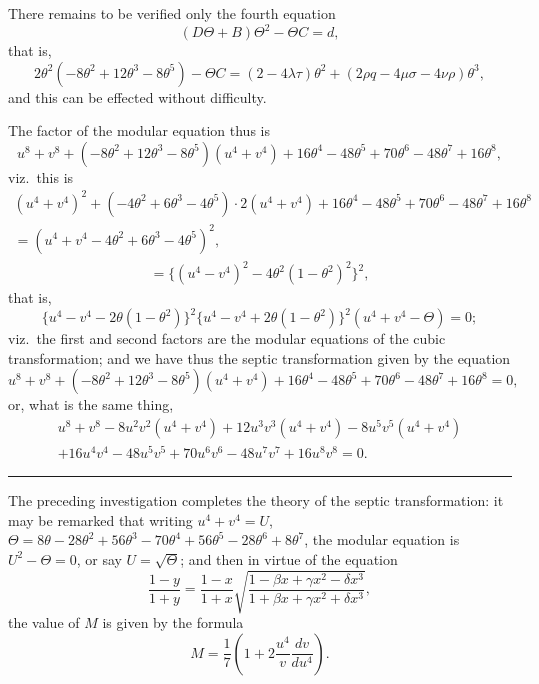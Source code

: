 \documentclass[11pt,a4paper]{book}
\begin{document}
There remains to be verified only the fourth equation
\[
(D\Theta + B)\Theta^2 - \Theta C = d,
\]
that is,
\[
2\theta^2(-8\theta^2 + 12\theta^3 - 8\theta^5) - \Theta C = (2 - 4\lambda\tau)\theta^2 + (2\rho q - 4\mu\sigma - 4\nu\rho)\theta^3,
\]
and this can be effected without difficulty.

The factor of the modular equation thus is
\[
u^8 + v^8 + (-8\theta^2 + 12\theta^3 - 8\theta^5)(u^4 + v^4) + 16\theta^4 - 48\theta^5 + 70\theta^6 - 48\theta^7 + 16\theta^8,
\]
viz.\ this is
\begin{multline*}
(u^4 + v^4)^2 + (-4\theta^2 + 6\theta^3 - 4\theta^5) \cdot 2(u^4 + v^4) + 16\theta^4 - 48\theta^5 + 70\theta^6 - 48\theta^7 + 16\theta^8\\
= (u^4 + v^4 - 4\theta^2 + 6\theta^3 - 4\theta^5)^2,
\end{multline*}
\begin{multline*}
= \{(u^4 - v^4)^2 - 4\theta^2(1 - \theta^2)^2\}^2,\end{multline*}
that is,
\[
\{u^4 - v^4 - 2\theta(1 - \theta^2)\}^2 \{u^4 - v^4 + 2\theta(1 - \theta^2)\}^2 (u^4 + v^4 - \Theta) = 0;
\]
viz.\ the first and second factors are the modular equations of the cubic transformation; and we have thus the septic transformation given by the equation
\[
u^8 + v^8 + (-8\theta^2 + 12\theta^3 - 8\theta^5)(u^4 + v^4) + 16\theta^4 - 48\theta^5 + 70\theta^6 - 48\theta^7 + 16\theta^8 = 0,
\]
or, what is the same thing,
\begin{multline*}
u^8 + v^8 - 8u^2 v^2(u^4 + v^4) + 12u^3 v^3(u^4 + v^4) - 8u^5 v^5(u^4 + v^4)\\
+ 16u^4 v^4 - 48u^5 v^5 + 70u^6 v^6 - 48u^7 v^7 + 16u^8 v^8 = 0.
\end{multline*}

\medskip
\noindent\rule{\textwidth}{0.4pt}

The preceding investigation completes the theory of the septic transformation: it may be remarked that writing $u^4 + v^4 = U$, $\Theta = 8\theta - 28\theta^2 + 56\theta^3 - 70\theta^4 + 56\theta^5 - 28\theta^6 + 8\theta^7$, the modular equation is $U^2 - \Theta = 0$, or say $U = \surd\Theta$; and then in virtue of the equation
\[
\frac{1 - y}{1 + y} = \frac{1 - x}{1 + x}\sqrt{\frac{1 - \beta x + \gamma x^2 - \delta x^3}{1 + \beta x + \gamma x^2 + \delta x^3}},
\]
the value of $M$ is given by the formula
\[
M = \frac{1}{7}\left(1 + 2\frac{u^4}{v}\frac{dv}{du^4}\right).
\]



\newpage
\end{document}
